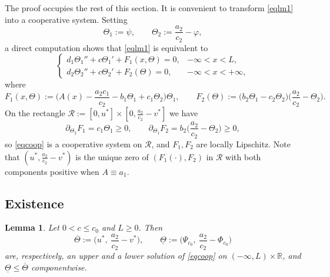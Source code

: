 \documentclass[reqno]{amsart}
\theoremstyle{plain}
\newtheorem{lemma}[theorem]{Lemma}
\theoremstyle{definition}
\theoremstyle{remark}
\begin{document}
The proof occupies the rest of this section. It is convenient to transform
\eqref{eqlm1} into a cooperative system. Setting
\begin{equation}\label{cooper}
	\Theta_1:=\psi,\qquad \Theta_2:=\frac{a_2}{c_2}-\varphi ,
\end{equation}
a direct computation shows that \eqref{eqlm1} is equivalent to
\begin{equation}\label{eqcoop}
	\begin{cases}
		d_1\Theta_1''+c\Theta_1'+F_1(x,\Theta)=0, & -\infty<x<L,\\
		d_2\Theta_2''+c\Theta_2'+F_2(\Theta)=0, & -\infty<x<+\infty,
	\end{cases}
\end{equation}
where
\[
F_1(x,\Theta):=\Big(A(x)-\frac{a_2c_1}{c_2}-b_1\Theta_1+c_1\Theta_2\Big)\Theta_1,
\qquad
F_2(\Theta):=\big(b_2\Theta_1-c_2\Theta_2\big)\Big(\frac{a_2}{c_2}-\Theta_2\Big).
\]
On the rectangle $\mathcal R:=[0,u^*]\times[0,\frac{a_2}{c_2}-v^*]$ we have
\[
\partial_{\Theta_2}F_1=c_1\Theta_1\ge0,
\qquad
\partial_{\Theta_1}F_2=b_2\Big(\frac{a_2}{c_2}-\Theta_2\Big)\ge0 ,
\]
so \eqref{eqcoop} is a cooperative system on $\mathcal R$, and $F_1,F_2$ are
locally Lipschitz. Note that $(u^*,\frac{a_2}{c_2}-v^*)$ is the unique zero of
$(F_1(\cdot),F_2)$ in $\mathcal R$ with both components positive when $A\equiv a_1$.

\subsection{Existence}

\begin{lemma}\label{lm:supersub}
	Let $0<c\le c_0$ and $L\ge0$. Then
	\[
	\overline\Theta:=\Big(u^*,\ \frac{a_2}{c_2}-v^*\Big),
	\qquad
	\underline\Theta:=\Big(\Psi_{c_0},\ \frac{a_2}{c_2}-\Phi_{c_0}\Big)
	\]
	are, respectively, an upper and a lower solution of \eqref{eqcoop} on
	$(-\infty,L)\times \mathbb{R}$, and $\underline\Theta\le\overline\Theta$ componentwise.
\end{lemma}
\end{document}
